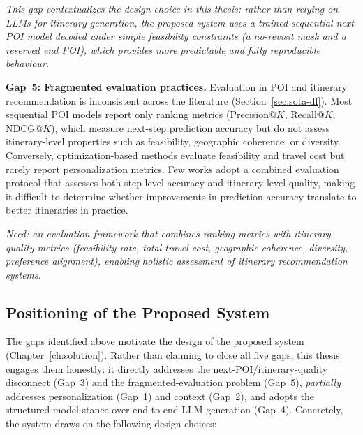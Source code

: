 \textit{This gap contextualizes the design choice in this thesis: rather than relying on LLMs for itinerary generation, the proposed system uses a trained sequential next-POI model decoded under simple feasibility constraints (a no-revisit mask and a reserved end POI), which provides more predictable and fully reproducible behaviour.}

\medskip

\textbf{Gap~5: Fragmented evaluation practices.}
Evaluation in POI and itinerary recommendation is inconsistent across the literature (Section~\ref{sec:sota-dl}). Most sequential POI models report only ranking metrics (Precision@$K$, Recall@$K$, NDCG@$K$), which measure next-step prediction accuracy but do not assess itinerary-level properties such as feasibility, geographic coherence, or diversity. Conversely, optimization-based methods evaluate feasibility and travel cost but rarely report personalization metrics. Few works adopt a combined evaluation protocol that assesses both step-level accuracy and itinerary-level quality, making it difficult to determine whether improvements in prediction accuracy translate to better itineraries in practice.

\textit{Need: an evaluation framework that combines ranking metrics with itinerary-quality metrics (feasibility rate, total travel cost, geographic coherence, diversity, preference alignment), enabling holistic assessment of itinerary recommendation systems.}

\subsection{Positioning of the Proposed System}
\label{sec:sota-synth-positioning}

The gaps identified above motivate the design of the proposed system (Chapter~\ref{ch:solution}). Rather than claiming to close all five gaps, this thesis engages them honestly: it directly addresses the next-POI/itinerary-quality disconnect (Gap~3) and the fragmented-evaluation problem (Gap~5), \emph{partially} addresses personalization (Gap~1) and context (Gap~2), and adopts the structured-model stance over end-to-end LLM generation (Gap~4). Concretely, the system draws on the following design choices:

